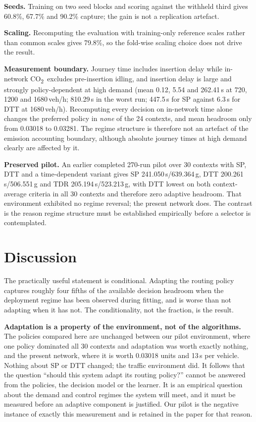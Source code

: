 \documentclass[10pt,a4paper]{article}
\newcommand{\CO}{CO\textsubscript{2}}
\begin{document}
\textbf{Seeds.} Training on two seed blocks and scoring against the withheld third gives 60.8\%, 67.7\% and 90.2\% capture; the gain is not a replication artefact.

\textbf{Scaling.} Recomputing the evaluation with training-only reference scales rather than common scales gives 79.8\%, so the fold-wise scaling choice does not drive the result.

\textbf{Measurement boundary.} Journey time includes insertion delay while in-network \CO\ excludes pre-insertion idling, and insertion delay is large and strongly policy-dependent at high demand (mean 0.12, 5.54 and 262.41\,s at 720, 1200 and 1680\,veh/h; 810.29\,s in the worst run; 447.5\,s for SP against 6.3\,s for DTT at 1680\,veh/h). Recomputing every decision on in-network time alone changes the preferred policy in \emph{none} of the 24 contexts, and mean headroom only from 0.03018 to 0.03281. The regime structure is therefore not an artefact of the emission accounting boundary, although absolute journey times at high demand clearly are affected by it.

\textbf{Preserved pilot.} An earlier completed 270-run pilot over 30 contexts with SP, DTT and a time-dependent variant gives SP 241.050\,s/639.364\,g, DTT 200.261\,s/506.551\,g and TDR 205.194\,s/523.213\,g, with DTT lowest on both context-average criteria in all 30 contexts and therefore zero adaptive headroom. That environment exhibited no regime reversal; the present network does. The contrast is the reason regime structure must be established empirically before a selector is contemplated.

\section{Discussion}
The practically useful statement is conditional. Adapting the routing policy captures roughly four fifths of the available decision headroom when the deployment regime has been observed during fitting, and is worse than not adapting when it has not. The conditionality, not the fraction, is the result.

\textbf{Adaptation is a property of the environment, not of the algorithms.} The policies compared here are unchanged between our pilot environment, where one policy dominated all 30 contexts and adaptation was worth exactly nothing, and the present network, where it is worth 0.03018 units and 13\,s per vehicle. Nothing about SP or DTT changed; the traffic environment did. It follows that the question ``should this system adapt its routing policy?'' cannot be answered from the policies, the decision model or the learner. It is an empirical question about the demand and control regimes the system will meet, and it must be measured before an adaptive component is justified. Our pilot is the negative instance of exactly this measurement and is retained in the paper for that reason.
\end{document}

